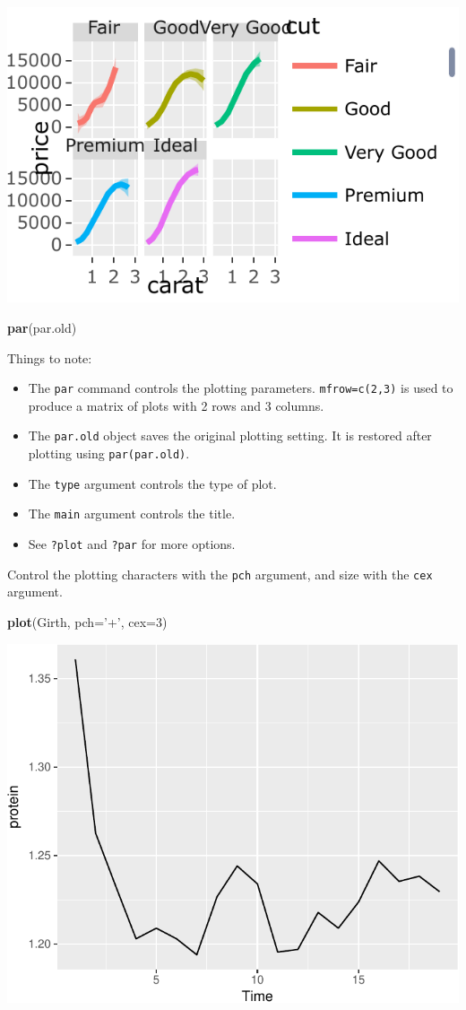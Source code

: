 \documentclass[]{book}
\newenvironment{Shaded}{\begin{snugshade}}{\end{snugshade}}
\newcommand{\DataTypeTok}[1]{\textcolor[rgb]{0.13,0.29,0.53}{#1}}
\newcommand{\DecValTok}[1]{\textcolor[rgb]{0.00,0.00,0.81}{#1}}
\newcommand{\KeywordTok}[1]{\textcolor[rgb]{0.13,0.29,0.53}{\textbf{#1}}}
\newcommand{\NormalTok}[1]{#1}
\newcommand{\StringTok}[1]{\textcolor[rgb]{0.31,0.60,0.02}{#1}}
\providecommand{\tightlist}{%
  \setlength{\itemsep}{0pt}\setlength{\parskip}{0pt}}
\theoremstyle{definition}
\theoremstyle{definition}
\theoremstyle{definition}
\theoremstyle{remark}
\begin{document}
\includegraphics[width=0.5\linewidth]{Rcourse_files/figure-latex/unnamed-chunk-252-1}

\begin{Shaded}
\begin{Highlighting}[]
\KeywordTok{par}\NormalTok{(par.old)}
\end{Highlighting}
\end{Shaded}

Things to note:

\begin{itemize}
\tightlist
\item
  The \texttt{par} command controls the plotting parameters. \texttt{mfrow=c(2,3)} is used to produce a matrix of plots with 2 rows and 3 columns.
\item
  The \texttt{par.old} object saves the original plotting setting. It is restored after plotting using \texttt{par(par.old)}.
\item
  The \texttt{type} argument controls the type of plot.
\item
  The \texttt{main} argument controls the title.
\item
  See \texttt{?plot} and \texttt{?par} for more options.
\end{itemize}

Control the plotting characters with the \texttt{pch} argument, and size with the \texttt{cex} argument.

\begin{Shaded}
\begin{Highlighting}[]
\KeywordTok{plot}\NormalTok{(Girth, }\DataTypeTok{pch=}\StringTok{'+'}\NormalTok{, }\DataTypeTok{cex=}\DecValTok{3}\NormalTok{)}
\end{Highlighting}
\end{Shaded}

\includegraphics[width=0.5\linewidth]{Rcourse_files/figure-latex/unnamed-chunk-253-1}
\end{document}
